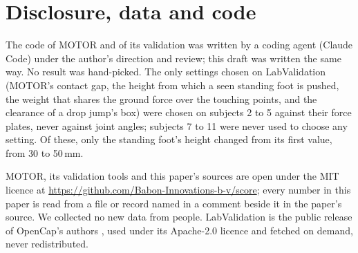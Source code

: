\documentclass[11pt]{article}
\begin{document}
\section{Disclosure, data and code}
\label{sec:availability}

The code of MOTOR and of its validation was written by a coding agent (Claude Code) under the author's direction and
review; this draft was written the same way. No result was hand-picked. The only settings chosen on LabValidation
(MOTOR's contact gap, the height from which a seen standing foot is pushed, the weight that shares the ground force
over the touching points, and the clearance of a drop jump's box) were chosen on subjects 2 to 5 against their force
plates, never against joint angles; subjects 7 to 11 were never used to choose any setting. Of these, only the
standing foot's height changed from its first value, from 30 to 50\,mm.

MOTOR, its validation tools and this paper's sources are open under the MIT licence at
\url{https://github.com/Babon-Innovations-b-v/score}; every number in this paper is read from a file or record named in
a comment beside it in the paper's source. We collected no new data from people. LabValidation is the public release
of OpenCap's authors \cite{uhlrich2023opencap}, used under its Apache-2.0 licence and fetched on demand, never
redistributed.
\end{document}
